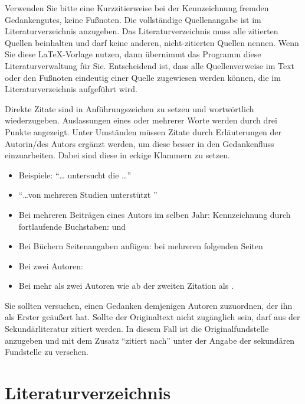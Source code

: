 \documentclass[a4paper,12pt]{scrartcl} %
\begin{document}
Verwenden Sie bitte eine Kurzzitierweise bei der Kennzeichnung fremden Gedankengutes, keine Fußnoten. Die vollständige Quellenangabe ist im Literaturverzeichnis anzugeben. Das Literaturverzeichnis muss alle zitierten Quellen beinhalten und darf keine anderen, nicht-zitierten Quellen nennen. Wenn Sie diese \LaTeX-Vorlage nutzen, dann übernimmt das Programm diese Literaturverwaltung für Sie.  Entscheidend ist, dass alle Quellenverweise im Text oder den Fußnoten eindeutig einer Quelle zugewiesen werden können, die im Literaturverzeichnis aufgeführt wird.

Direkte Zitate sind in Anführungszeichen zu setzen und wortwörtlich wiederzugeben. Auslassungen eines oder mehrerer Worte werden durch drei Punkte angezeigt. Unter Umständen müssen Zitate durch Erläuterungen der Autorin/des Autors ergänzt werden, um diese besser in den Gedankenfluss einzuarbeiten. Dabei sind diese in eckige Klammern zu setzen.


\begin{itemize}
  \item Beispiele: ``\ldots \textcite{Solow1979} untersucht die \ldots''
  \item ``\ldots  von mehreren Studien unterstützt \parencite[][]{Solow1979,Yellen1984}''
  \item Bei mehreren Beiträgen eines Autors im selben Jahr: Kennzeichnung durch
        fortlaufende Buchstaben: \textcite{SGU2004JET} und \textcite{SGU2004}
   \item  Bei Büchern Seitenangaben anfügen: \textcite[][99]{Gali2015book} \textcite[][99\psq]{Gali2015book} \textcite[][99\psqq]{Gali2015book} bei mehreren folgenden Seiten
\item  Bei zwei Autoren: \textcite{SGU2004}
\item  Bei mehr als zwei Autoren wie \textcite{FernandezEtAl2007} ab der zweiten Zitation als \textcite{FernandezEtAl2007}.
\end{itemize}

Sie sollten versuchen, einen Gedanken demjenigen Autoren zuzuordnen, der ihn als Erster geäußert hat. Sollte der Originaltext nicht zugänglich sein, darf aus der Sekundärliteratur zitiert werden. In diesem Fall ist die Originalfundstelle anzugeben und mit dem Zusatz ``zitiert nach'' unter der Angabe der sekundären Fundstelle zu versehen.

\clearpage

\section{Literaturverzeichnis}
\end{document}
